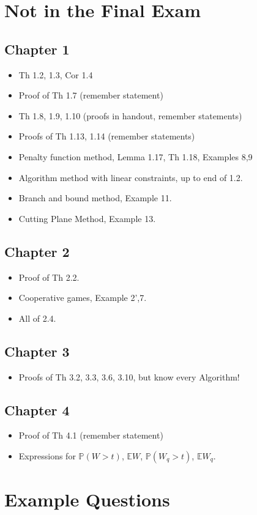 \section{\textbf{Not} in the Final Exam}

\subsection{Chapter 1} 
\begin{itemize}
    \item Th 1.2, 1.3, Cor 1.4
    \item Proof of Th 1.7 (remember statement)
    \item Th 1.8, 1.9, 1.10 (proofs in handout, remember statements)
    \item Proofs of Th 1.13, 1.14 (remember statements)
    \item Penalty function method, Lemma 1.17, Th 1.18, Examples 8,9
    \item Algorithm method with linear constraints, up to end of 1.2.
    \item Branch and bound method, Example 11.
    \item Cutting Plane Method, Example 13.
\end{itemize}

\subsection{Chapter 2}
\begin{itemize}
    \item Proof of Th 2.2.
    \item Cooperative games, Example 2',7.
    \item All of 2.4.
\end{itemize}

\subsection{Chapter 3}
\begin{itemize}
    \item Proofs of Th 3.2, 3.3, 3.6, 3.10, but know every Algorithm!
\end{itemize}

\subsection{Chapter 4}
\begin{itemize}
    \item Proof of Th 4.1 (remember statement)
    \item Expressions for $\mathbb{P}(W>t)$, $\mathbb{E}W$, $\mathbb{P}(W_q>t)$, $\mathbb{E}W_q$.
\end{itemize}

\section{Example Questions}







